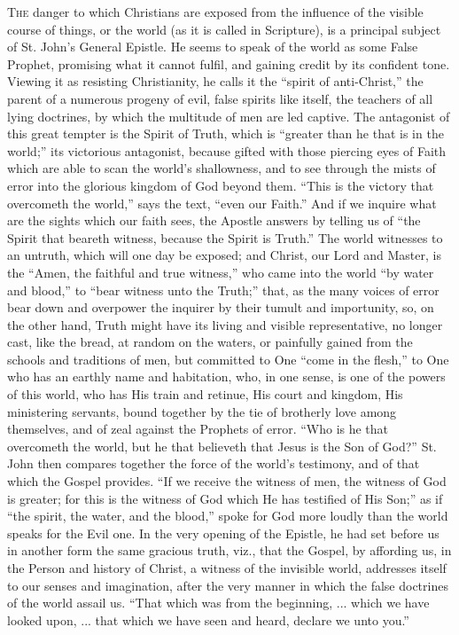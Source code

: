 T\textsc{he} danger to which Christians are exposed from the influence of
the visible course of things, or the world (as it is called in
Scripture), is a principal subject of St. John's General Epistle. He
seems to speak of the world as some False Prophet, promising what it
cannot fulfil, and gaining credit by its confident tone. Viewing it as
resisting Christianity, he calls it the ``spirit of
anti-Christ,'' the parent of a numerous progeny of evil, false
spirits like itself, the teachers of all lying doctrines, by which the
multitude of men are led captive. The antagonist of this great tempter
is the Spirit of Truth, which is ``greater than he that is in the
world;'' its victorious antagonist, because gifted with those
piercing eyes of Faith which are able to scan the world's shallowness,
and to see through the mists of error into the glorious kingdom of God
beyond them. ``This is the victory that overcometh the
world,'' says the text, ``even our Faith.'' And if we
inquire what are the sights which our faith sees, the Apostle answers
by telling us of ``the Spirit that beareth witness, because the
Spirit is Truth.'' The world witnesses to an untruth, which will
one day be exposed; and Christ, our Lord and Master, is the
``Amen, the faithful and true witness,'' who came into the
world ``by water and blood,'' to ``bear witness unto the
Truth;'' that, as the many voices of error bear down and overpower
the inquirer by their tumult and importunity, so, on the other hand,
Truth might have its living and visible representative, no longer
cast, like the bread, at random on the waters, or painfully gained
from the schools and traditions of men, but committed to One
``come in the flesh,'' to One who has an earthly name and
habitation, who, in one sense, is one of the powers of this world, who
has His train and retinue, His court and kingdom, His ministering
servants, bound together by the tie of brotherly love among
themselves, and of zeal against the Prophets of error. ``Who is he
that overcometh the world, but he that believeth that Jesus is the Son
of God?'' St. John then compares together the force of the world's
testimony, and of that which the Gospel provides. ``If we receive
the witness of men, the witness of God is greater; for this is the
witness of God which He has testified of His Son;'' as if
``the spirit, the water, and the blood,'' spoke for God more
loudly than the world speaks for the Evil one. In the very opening of
the Epistle, he had set before us in another form the same gracious
truth, viz., that the Gospel, by affording us, in the Person and
history of Christ, a witness of the invisible world, addresses itself
to our senses and imagination, after the very manner in which the
false doctrines of the world assail us. ``That which was from the
beginning, ... which we have looked upon, ... that which we have seen
and heard, declare we unto you.''


